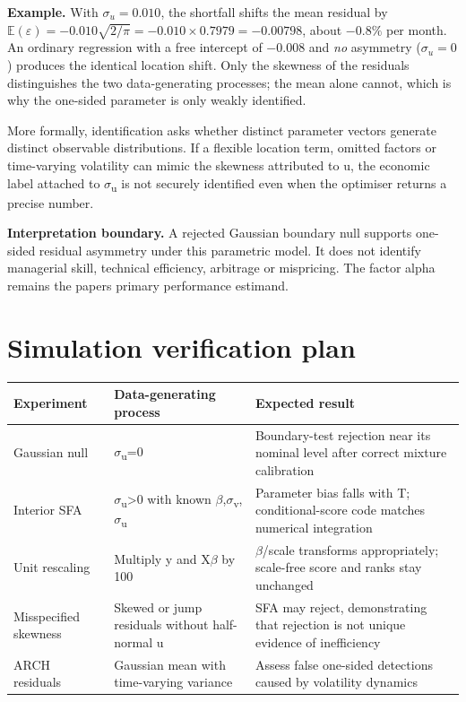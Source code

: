 \textbf{Example.} With $\sigma_u=0.010$, the shortfall shifts the mean
residual by $\mathbb{E}(\varepsilon)=-0.010\sqrt{2/\pi}=-0.010\times0.7979
=-0.00798$, about $-0.8\%$ per month. An ordinary regression with a free
intercept of $-0.008$ and \emph{no} asymmetry ($\sigma_u=0$) produces the
identical location shift. Only the skewness of the residuals distinguishes
the two data-generating processes; the mean alone cannot, which is why the
one-sided parameter is only weakly identified.

More formally, identification asks whether distinct parameter vectors
generate distinct observable distributions. If a flexible location term,
omitted factors or time-varying volatility can mimic the skewness
attributed to u, the economic label attached to \ensuremath{\sigma }\textsubscript{u} is
not securely identified even when the optimiser returns a precise
number.

\textbf{Interpretation boundary.} A rejected Gaussian boundary null
supports one-sided residual asymmetry under this parametric model. It
does not identify managerial skill, technical efficiency, arbitrage or
mispricing. The factor alpha remains the paper\textquotesingle s primary
performance estimand.

\hypertarget{simulation-verification-plan}{%
\section{Simulation verification
plan}\label{simulation-verification-plan}}

\begin{longtable}[]{@{}p{}p{}p{}@{}}
\toprule\noalign{}
Experiment & Data-generating process & Expected result \\
\midrule\noalign{}
\endhead
\bottomrule\noalign{}
\endlastfoot
Gaussian null & \ensuremath{\sigma }\textsubscript{u}=0 & Boundary-test rejection near its
nominal level after correct mixture calibration \\
Interior SFA & \ensuremath{\sigma }\textsubscript{u}\textgreater0 with known
\ensuremath{\beta },\ensuremath{\sigma }\textsubscript{v},\ensuremath{\sigma }\textsubscript{u} & Parameter bias falls with T;
conditional-score code matches numerical integration \\
Unit rescaling & Multiply y and X\ensuremath{\beta } by 100 & \ensuremath{\beta }/scale transforms
appropriately; scale-free score and ranks stay unchanged \\
Misspecified skewness & Skewed or jump residuals without half-normal u &
SFA may reject, demonstrating that rejection is not unique evidence of
inefficiency \\
ARCH residuals & Gaussian mean with time-varying variance & Assess false
one-sided detections caused by volatility dynamics \\
\end{longtable}

